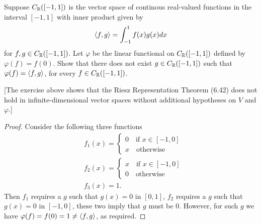 \begin{exercise}{15}
  Suppose $C_{\mathbb{R}}([-1,1])$ is the vector space of continous real-valued functions in the interval $[-1,1]$ with inner product given by
  \begin{align*}
      \langle f,g\rangle = \int_{-1}^1f(x)g(x)dx
  \end{align*}
  for $f,g\in C_{\mathbb{R}}([-1,1])$. Let $\varphi$ be the linear functional on $C_{\mathbb{R}}([-1,1])$ defined by $\varphi(f)=f(0)$. Show that there does not exist $g\in C_{\mathbb{R}}([-1,1])$ such that $\varphi(f)=\langle f,g\rangle$, for every $f\in C_{\mathbb{R}}([-1,1])$.

  [The exercise above shows that the Riesz Representation Theorem (6.42) does not hold in infinite-dimensional vector spaces without additional hypotheses on $V$ and $\varphi$.]
\end{exercise}
\begin{proof}
 Consider the following three functions
 \begin{align*}
     &f_1(x) =
     \begin{cases}
         0\quad\text{if } x\in[-1,0]\\
         x\quad\text{otherwise}
     \end{cases}\\
     &f_2(x) =
     \begin{cases}
         x\quad\text{if } x\in[-1,0]\\
         0\quad\text{otherwise}
     \end{cases}\\
     &f_3(x) = 1.
 \end{align*}
 Then $f_1$ requires a $g$ such that $g(x)=0$ in $[0,1]$, $f_2$ requires a $g$ such that $g(x)=0$ in $[-1,0]$, these two imply that $g$ must be 0. However, for such $g$ we have $\varphi(f)=f(0)=1\neq\langle f,g\rangle$, as required.
\end{proof}

